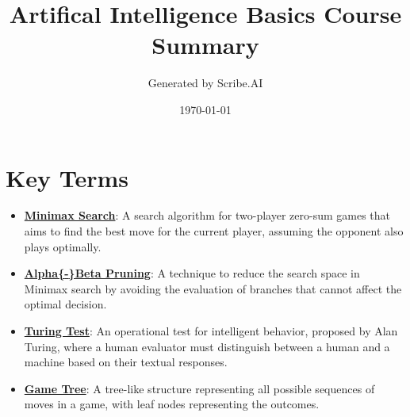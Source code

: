 \documentclass{article}%
\title{Artifical Intelligence Basics Course Summary}%
\author{Generated by Scribe.AI}%
\date{\today}%
\begin{document}
%
\normalsize%
\maketitle%
\section{Key Terms}%
\label{sec:KeyTerms}%
\begin{itemize}[leftmargin=*]%
\item \href{https://purdue.brightspace.com/d2l/common/assets/pdfjs-d2l-dist/1.0.14-legacy/web/viewer.html?file=\%2Fcontent\%2Fenforced\%2F1095467-wl.202510.CS.24300.001\%2F02L2-Intro.pdf\%3Fou\%3D1095467\&lang=en-us\&container=d2l-fileviewer-rendered-pdf\&fullscreen=d2l-fileviewer-rendered-pdf-dialog\&height=667#page=22}{\textbf{Minimax Search}}: A search algorithm for two{-}player zero{-}sum games that aims to find the best move for the current player, assuming the opponent also plays optimally.%
\item \href{https://purdue.brightspace.com/d2l/common/assets/pdfjs-d2l-dist/1.0.14-legacy/web/viewer.html?file=\%2Fcontent\%2Fenforced\%2F1095467-wl.202510.CS.24300.001\%2F02L2-Intro.pdf\%3Fou\%3D1095467\&lang=en-us\&container=d2l-fileviewer-rendered-pdf\&fullscreen=d2l-fileviewer-rendered-pdf-dialog\&height=667#page=23}{\textbf{Alpha\{{-}\}Beta Pruning}}: A technique to reduce the search space in Minimax search by avoiding the evaluation of branches that cannot affect the optimal decision.%
\item \href{https://purdue.brightspace.com/d2l/common/assets/pdfjs-d2l-dist/1.0.14-legacy/web/viewer.html?file=\%2Fcontent\%2Fenforced\%2F1095467-wl.202510.CS.24300.001\%2F02L2-Intro.pdf\%3Fou\%3D1095467\&lang=en-us\&container=d2l-fileviewer-rendered-pdf\&fullscreen=d2l-fileviewer-rendered-pdf-dialog\&height=667#page=6}{\textbf{Turing Test}}: An operational test for intelligent behavior, proposed by Alan Turing, where a human evaluator must distinguish between a human and a machine based on their textual responses.%
\item \href{https://purdue.brightspace.com/d2l/common/assets/pdfjs-d2l-dist/1.0.14-legacy/web/viewer.html?file=\%2Fcontent\%2Fenforced\%2F1095467-wl.202510.CS.24300.001\%2F02L2-Intro.pdf\%3Fou\%3D1095467\&lang=en-us\&container=d2l-fileviewer-rendered-pdf\&fullscreen=d2l-fileviewer-rendered-pdf-dialog\&height=667#page=11}{\textbf{Game Tree}}: A tree{-}like structure representing all possible sequences of moves in a game, with leaf nodes representing the outcomes.%

\end{itemize}
\end{document}
